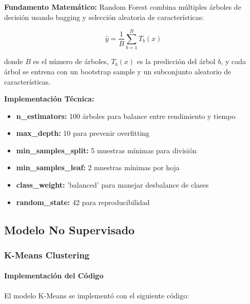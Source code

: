 \documentclass[12pt,letterpaper]{article}
\begin{document}
\textbf{Fundamento Matemático:}
Random Forest combina múltiples árboles de decisión usando bagging y selección aleatoria de características:

\begin{equation}
\hat{y} = \frac{1}{B} \sum_{b=1}^{B} T_b(x)
\end{equation}

donde $B$ es el número de árboles, $T_b(x)$ es la predicción del árbol $b$, y cada árbol se entrena con un bootstrap sample y un subconjunto aleatorio de características.

\textbf{Implementación Técnica:}
\begin{itemize}
    \item \textbf{n\_estimators:} 100 árboles para balance entre rendimiento y tiempo
    \item \textbf{max\_depth:} 10 para prevenir overfitting
    \item \textbf{min\_samples\_split:} 5 muestras mínimas para división
    \item \textbf{min\_samples\_leaf:} 2 muestras mínimas por hoja
    \item \textbf{class\_weight:} 'balanced' para manejar desbalance de clases
    \item \textbf{random\_state:} 42 para reproducibilidad
\end{itemize}

\subsection{Modelo No Supervisado}

\subsubsection{K-Means Clustering}

\paragraph{Implementación del Código}

El modelo K-Means se implementó con el siguiente código:
\end{document}
